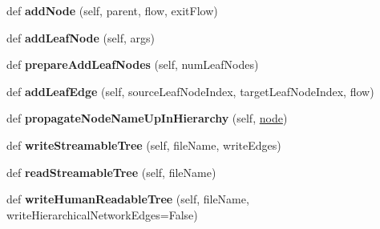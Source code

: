 \begin{DoxyCompactItemize}
def {\bfseries add\+Node} (self, parent, flow, exit\+Flow)
\item 
\mbox{\label{classinfomapfolder_1_1infomap_1_1HierarchicalNetwork_a9c45a3303a390768815f2c88200df1ca}} 
def {\bfseries add\+Leaf\+Node} (self, args)
\item 
\mbox{\label{classinfomapfolder_1_1infomap_1_1HierarchicalNetwork_a00485587a39e89aa418c31d6ae8e06fb}} 
def {\bfseries prepare\+Add\+Leaf\+Nodes} (self, num\+Leaf\+Nodes)
\item 
\mbox{\label{classinfomapfolder_1_1infomap_1_1HierarchicalNetwork_a6cb5ce1876223c1d2d711e49b78ed859}} 
def {\bfseries add\+Leaf\+Edge} (self, source\+Leaf\+Node\+Index, target\+Leaf\+Node\+Index, flow)
\item 
\mbox{\label{classinfomapfolder_1_1infomap_1_1HierarchicalNetwork_aeb8cce3adf0702045f3c94799166559c}} 
def {\bfseries propagate\+Node\+Name\+Up\+In\+Hierarchy} (self, \mbox{\hyperlink{structnode}{node}})
\item 
\mbox{\label{classinfomapfolder_1_1infomap_1_1HierarchicalNetwork_a89e0a0a44816226229b1382b36c5d037}} 
def {\bfseries write\+Streamable\+Tree} (self, file\+Name, write\+Edges)
\item 
\mbox{\label{classinfomapfolder_1_1infomap_1_1HierarchicalNetwork_a2d5eec6ae09df48626e3b7ed3266d583}} 
def {\bfseries read\+Streamable\+Tree} (self, file\+Name)
\item 
\mbox{\label{classinfomapfolder_1_1infomap_1_1HierarchicalNetwork_a1639fe381011f513395b75b2a4da133c}} 
def {\bfseries write\+Human\+Readable\+Tree} (self, file\+Name, write\+Hierarchical\+Network\+Edges=False)
\item 
\mbox{\label{classinfomapfolder_1_1infomap_1_1HierarchicalNetwork_a745faa8e8e89bbd5f4e740b444dd6651}} 

\end{DoxyCompactItemize}
